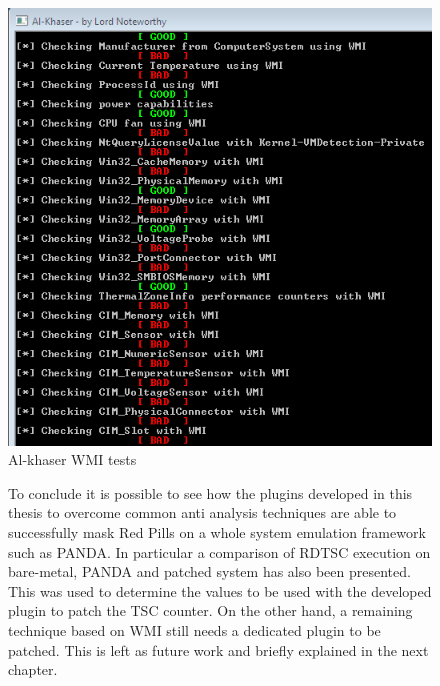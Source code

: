 \begin{figure}[hp!]
    \centering
    \includegraphics[width=0.8\linewidth]{images/al1.png}%
    \caption{Al-khaser WMI tests}%
    \label{fig:alk1}%
\end{figure}

\begin{figure}[h!]
    To conclude it is possible to see how the plugins developed in this thesis to overcome common anti analysis techniques are able to successfully mask Red Pills on a whole system emulation framework such as PANDA. In particular a comparison of RDTSC execution on bare-metal, PANDA and patched system has also been presented. This was used to determine the values to be used with the developed plugin to patch the TSC counter. On the other hand, a remaining technique based on WMI still needs a dedicated plugin to be patched. This is left as future work and briefly explained in the next chapter.
\end{figure}





